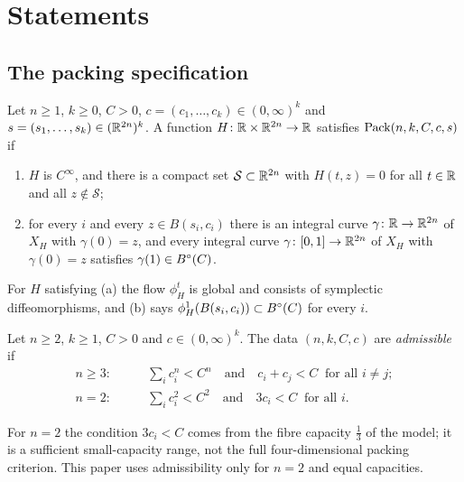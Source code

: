 \section{Statements}\label{sec:results}

\subsection{The packing specification}\label{sec:results-general}

\begin{definition}\label{def:intro-spec}
Let $n\ge1$, $k\ge0$, $C>0$, $c=(c_1,\dots,c_k)\in(0,\infty)^k$ and $s=(s_1,\dots,s_k)\in(\mathbb{R}^{2n})^k$. A
function $H\colon\mathbb{R}\times\mathbb{R}^{2n}\to\mathbb{R}$ satisfies $\mathrm{Pack}(n,k,C,c,s)$ if
\begin{enumerate}[label=(\alph*)]
\item $H$ is $C^\infty$, and there is a compact set $\mathcal S\subset\mathbb{R}^{2n}$ with $H(t,z)=0$ for all
 $t\in\mathbb{R}$ and all $z\notin\mathcal S$;
\item for every $i$ and every $z\in B(s_i,c_i)$ there is an integral curve $\gamma\colon\mathbb{R}\to\mathbb{R}^{2n}$ of
 $X_H$ with $\gamma(0)=z$, and every integral curve $\gamma\colon[0,1]\to\mathbb{R}^{2n}$ of $X_H$ with
 $\gamma(0)=z$ satisfies $\gamma(1)\in B^{\circ}(C)$.
\end{enumerate}
\end{definition}

For $H$ satisfying (a) the flow $\phi^t_H$ is global and consists of symplectic diffeomorphisms, and
(b) says $\phi^1_H(B(s_i,c_i))\subset B^{\circ}(C)$ for every $i$.

\begin{definition}\label{def:intro-admissible}
Let $n\ge2$, $k\ge1$, $C>0$ and $c\in(0,\infty)^k$. The data $(n,k,C,c)$ are \emph{admissible} if
\begin{align*}
 n\ge3:&\qquad \textstyle\sum_ic_i^n<C^n\quad\text{and}\quad c_i+c_j<C\ \text{ for all } i\ne j;\\
 n=2:&\qquad \textstyle\sum_ic_i^2<C^2\quad\text{and}\quad 3c_i<C\ \text{ for all } i.
\end{align*}
\end{definition}

For $n=2$ the condition $3c_i<C$ comes from the fibre capacity $\frac13$ of the model; it is a sufficient
small-capacity range, not the full four-dimensional packing criterion. This paper uses admissibility only for $n=2$
and equal capacities.


